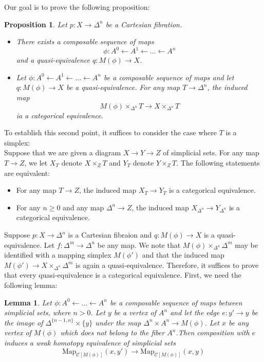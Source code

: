 \documentclass[12pt]{amsart}
\newcommand{\8}{\ensuremath{\infty}}
\newcommand{\Map}{\ensuremath{\text{Map}}}
\newtheorem{lemma}{Lemma}
\newtheorem{proposition}{Proposition}
\begin{document}
{{Our goal is to prove the following proposition:
\begin{proposition}
  Let $p:X\rightarrow \Delta^n$ be a Cartesian fibration.
  \begin{itemize}
    \item There exists a composable sequence of maps \[\phi:A^0\leftarrow A^1\leftarrow \dots \leftarrow A^n\] and a quasi-equivalence $q:M(\phi)\rightarrow X$.
    \item Let $\phi:A^0\leftarrow A^1\leftarrow \dots\leftarrow A^n$ be a composable sequence of maps and let $q:M(\phi)\rightarrow X$ be a quasi-equivalence. For any map $T\rightarrow \Delta^n$, the induced map \[M(\phi)\times_{\Delta^n}T\rightarrow X\times_{\Delta^n}T\]ia a categorical equivalence.
  \end{itemize}
\end{proposition}

To establish this second point, it suffices to consider the case where $T$ is a simplex:\\
Suppose that we are given a diagram $X\rightarrow Y\rightarrow Z$ of simplicial sets. For any map $T\rightarrow Z$, we let $X_T$ denote $X\times_Z T$ and $Y_T$ denote $Y\times_Z T$. The following statements are equivalent:
\begin{itemize}
  \item For any map $T\rightarrow Z$, the induced map $X_T\rightarrow Y_T$ is a categorical equivalence.
  \item For any $n\geq 0$ and any map $\Delta^n\rightarrow Z$, the induced map $X_{\Delta^n}\rightarrow Y_{\Delta^n}$ is a categorical equivalence.
\end{itemize}

Suppose $p:X\rightarrow\Delta^n$ is a Cartesian fibraion and $q:M(\phi)\rightarrow X$ is a quasi-equivalence. Let $f:\Delta^m\rightarrow \Delta^n$ be any map. We note that $M(\phi)\times_{\Delta^n}\Delta^m$ may be identified with a mapping simplex $M(\phi')$ and that the induced map $M(\phi')\rightarrow X\times_{\Delta^n}\Delta^m$ is again a quasi-equivalence. Therefore, it suffices to prove that every quasi-equivalence is a categorical equivalence. First, we need the following lemma:

\begin{lemma}
  Let $\phi:A^0\leftarrow\dots\leftarrow A^n$ be a composable sequence of maps between simplicial sets, where $n>0$. Let $y$ be a vertex of $A^n$ and let the edge $e:y'\rightarrow y$ be the image of $\Delta^{\{n-1,n\}}\times \{y\}$ under the map $\Delta^n\times A^n\rightarrow M(\phi)$. Let $x$ be any vertex of $M(\phi)$ which does not belong to the fiber $A^n$.Then composition with $e$ induces a weak homotopy equivalence of simplicial sets \[\Map_{\mathscr{C}[M(\phi)]}(x,y')\rightarrow \Map_{\mathscr{C}[M(\phi)]}(x,y)\]
\end{lemma}

}}
\end{document}
